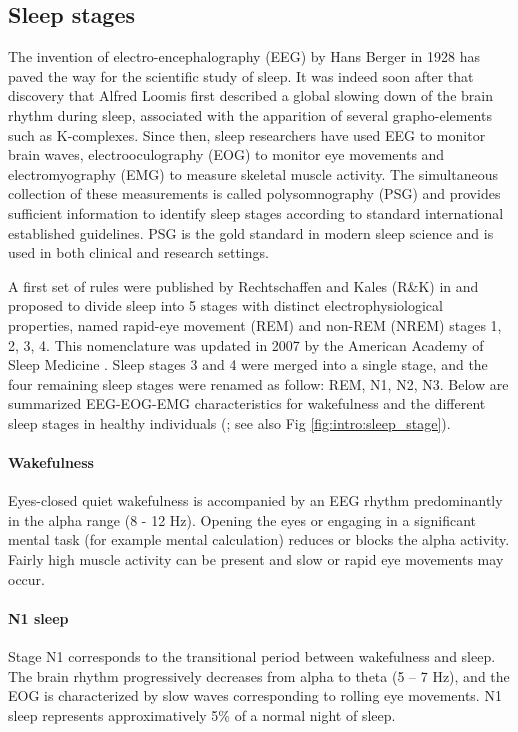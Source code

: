 \subsection{Sleep stages}
\label{sec:dream-research:sleep:stages}

The invention of electro-encephalography (EEG) by Hans Berger in 1928 has paved the way for the scientific study of sleep. It was indeed soon after that discovery that Alfred Loomis first described a global slowing down of the brain rhythm during sleep, associated with the apparition of several grapho-elements such as K-complexes. Since then, sleep researchers have used EEG to monitor brain waves, electrooculography (EOG) to monitor eye movements and electromyography (EMG) to measure skeletal muscle activity. The simultaneous collection of these measurements is called polysomnography (PSG) and provides sufficient information to identify sleep stages according to standard international established guidelines. PSG is the gold standard in modern sleep science and is used in both clinical and research settings.

A first set of rules were published by Rechtschaffen and Kales (R\&K) in \citeyear{kales_manual_1968} and proposed to divide sleep into 5 stages with distinct electrophysiological properties, named rapid-eye movement (REM) and non-REM (NREM) stages 1, 2, 3, 4. This nomenclature was updated in 2007 by the American Academy of Sleep Medicine \citep{iber_aasm_2007}. Sleep stages 3 and 4 were merged into a single stage, and the four remaining sleep stages were renamed as follow: REM, N1, N2, N3. Below are summarized EEG-EOG-EMG characteristics for wakefulness and the different sleep stages in healthy individuals (\citealp{hirshkowitz_normal_2004, iber_aasm_2007}; see also Fig \ref{fig:intro:sleep_stage}).

\paragraph{Wakefulness}
Eyes-closed quiet wakefulness is accompanied by an EEG rhythm predominantly in the alpha range (8 - 12 Hz). Opening the eyes or engaging in a significant mental task (for example mental calculation) reduces or blocks the alpha activity. Fairly high muscle activity can be present and slow or rapid eye movements may occur.

\paragraph{N1 sleep}
Stage N1 corresponds to the transitional period between wakefulness and sleep. The brain rhythm progressively decreases from alpha to theta (5 – 7 Hz), and the EOG is characterized by slow waves corresponding to rolling eye movements. N1 sleep represents approximatively 5\% of a normal night of sleep.

